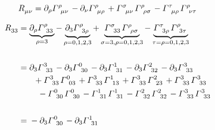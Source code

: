 \documentclass{jsarticle}
\begin{document}

\begin{equation}
    \tensor{R}{_{\mu\nu}} = \partial_\rho \tensor{\varGamma}{^\rho_{\mu\nu}} 
                            - \partial_\nu \tensor{\varGamma}{^\rho_{\mu\rho}}
                            + \tensor{\varGamma}{^\sigma_{\mu\nu}} \tensor{\varGamma}{^\rho_{\rho\sigma}}
                            - \tensor{\varGamma}{^\tau_{\mu\rho}} \tensor{\varGamma}{^\rho_{\nu\tau}}
\end{equation}

\begin{align}
    \tensor{R}{_{33}} &= \underbrace{\partial_\rho \tensor{\varGamma}{^\rho_{33}}}_{\rho=3} 
                            - \underbrace{\partial_3 \tensor{\varGamma}{^\rho_{3\rho}}}_{\rho=0,1,2,3}
                            + \underbrace{\tensor{\varGamma}{^\sigma_{33}} \tensor{\varGamma}{^\rho_{\rho\sigma}}}_{\sigma=3,\rho=0,1,2,3}
                            - \underbrace{\tensor{\varGamma}{^\tau_{3\rho}} \tensor{\varGamma}{^\rho_{3\tau}}}_{\tau=\rho=0,1,2,3}\\\nonumber
    \\
    &= \begin{multlined}[t]
            \partial_3 \tensor{\varGamma}{^3_{33}}
            - \partial_3 \tensor{\varGamma}{^0_{30}} 
            - \partial_3 \tensor{\varGamma}{^1_{31}}
            - \partial_3 \tensor{\varGamma}{^2_{32}}
            - \partial_3 \tensor{\varGamma}{^3_{33}}\\
            + \tensor{\varGamma}{^3_{33}} \tensor{\varGamma}{^0_{03}}
            + \tensor{\varGamma}{^3_{33}} \tensor{\varGamma}{^1_{13}}
            + \tensor{\varGamma}{^3_{33}} \tensor{\varGamma}{^2_{23}}
            + \tensor{\varGamma}{^3_{33}} \tensor{\varGamma}{^3_{33}}\\
            - \tensor{\varGamma}{^0_{30}} \tensor{\varGamma}{^0_{30}}            
            - \tensor{\varGamma}{^1_{31}} \tensor{\varGamma}{^1_{31}}
            - \tensor{\varGamma}{^2_{32}} \tensor{\varGamma}{^2_{32}}
            - \tensor{\varGamma}{^3_{33}} \tensor{\varGamma}{^3_{33}}
        \end{multlined}\\\nonumber
        \\
    &= \begin{multlined}[t]
            - \partial_3 \tensor{\varGamma}{^0_{30}} 
            - \partial_3 \tensor{\varGamma}{^1_{31}}

\end{multlined}
\end{align}
\end{document}
